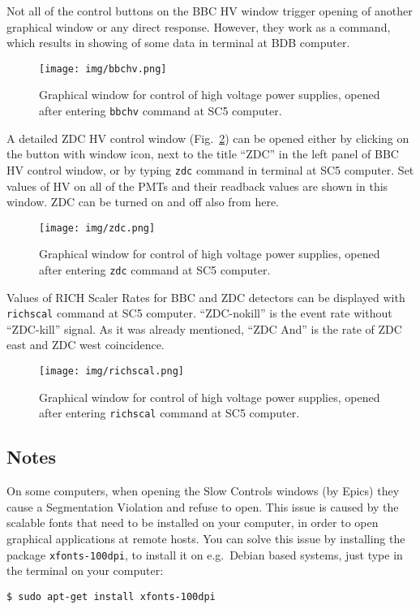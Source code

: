 Not all of the control buttons on the BBC HV window trigger opening of another graphical window or any direct response. However, they work as a command, which results in showing of some data in terminal at BDB computer.

 
\begin{figure}[htb]
  \begin{center}
    \texttt{[image: img/bbchv.png]}
  \end{center}
  \caption{Graphical window for control of high voltage power supplies, opened after entering \texttt{bbchv} command at SC5 computer.}
\label{bbchv}
\end{figure}

A detailed ZDC HV control window (Fig.~\ref{zdcwindow}) can be opened either by clicking on the button with window icon, next to the title ``ZDC'' in the left panel of BBC HV control window, or by typing \texttt{zdc} command in terminal at SC5 computer. Set values of HV on all of the PMTs and their readback values are shown in this window.  ZDC can be turned on and off also from here.

\begin{figure}[htb]
  \begin{center}
    \texttt{[image: img/zdc.png]}
  \end{center}
  \caption{Graphical window for control of high voltage power supplies, opened after entering \texttt{zdc} command at SC5 computer.}
\label{zdcwindow}
\end{figure}

Values of RICH Scaler Rates for BBC and ZDC detectors can be displayed with \texttt{richscal} command at SC5 computer. ``ZDC-nokill'' is the event rate without ``ZDC-kill'' signal. As it was already mentioned, ``ZDC And'' is the rate of ZDC east and ZDC west coincidence.

\begin{figure}[htb]
  \begin{center}
    \texttt{[image: img/richscal.png]}
  \end{center}
  \caption{Graphical window for control of high voltage power supplies, opened after entering \texttt{richscal} command at SC5 computer.}
\label{richscal}
\end{figure}


\subsection{Notes}
On some computers, when opening the Slow Controls windows (by Epics) they cause a Segmentation Violation and refuse to open. This issue is caused by the scalable fonts that need to be installed on your computer, in order to open graphical applications at remote hosts.
You can solve this issue by installing the package \texttt{xfonts-100dpi}, to install it on e.g.\ Debian based systems, just type in the terminal on your computer:
\begin{verbatim}
$ sudo apt-get install xfonts-100dpi
\end{verbatim}

